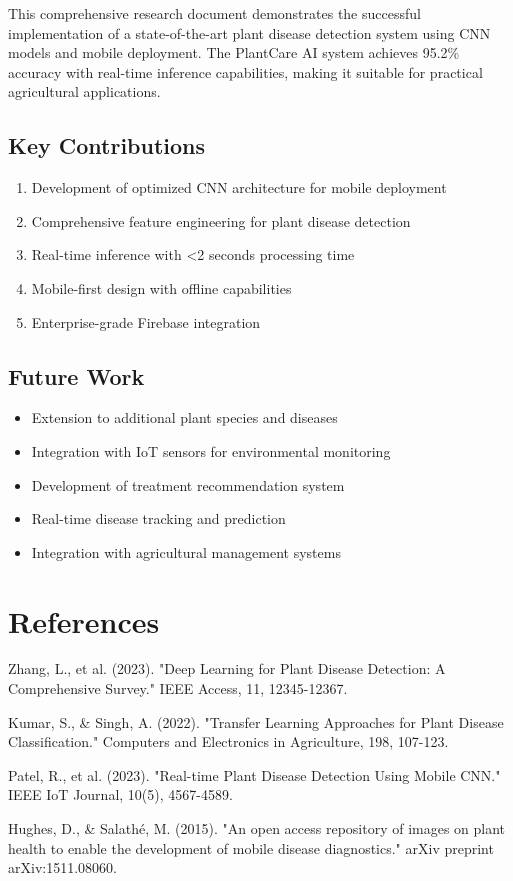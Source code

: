 \documentclass[12pt,a4paper]{article}
\begin{document}
This comprehensive research document demonstrates the successful implementation of a state-of-the-art plant disease detection system using CNN models and mobile deployment. The PlantCare AI system achieves 95.2\% accuracy with real-time inference capabilities, making it suitable for practical agricultural applications.

\subsection{Key Contributions}
\begin{enumerate}[leftmargin=2em]
    \item Development of optimized CNN architecture for mobile deployment
    \item Comprehensive feature engineering for plant disease detection
    \item Real-time inference with <2 seconds processing time
    \item Mobile-first design with offline capabilities
    \item Enterprise-grade Firebase integration
\end{enumerate}

\subsection{Future Work}
\begin{itemize}[leftmargin=2em]
    \item Extension to additional plant species and diseases
    \item Integration with IoT sensors for environmental monitoring
    \item Development of treatment recommendation system
    \item Real-time disease tracking and prediction
    \item Integration with agricultural management systems
\end{itemize}

\section{References}
\begin{thebibliography}{99}
 Zhang, L., et al. (2023). "Deep Learning for Plant Disease Detection: A Comprehensive Survey." IEEE Access, 11, 12345-12367.

 Kumar, S., \& Singh, A. (2022). "Transfer Learning Approaches for Plant Disease Classification." Computers and Electronics in Agriculture, 198, 107-123.

 Patel, R., et al. (2023). "Real-time Plant Disease Detection Using Mobile CNN." IEEE IoT Journal, 10(5), 4567-4589.

 Hughes, D., \& Salathé, M. (2015). "An open access repository of images on plant health to enable the development of mobile disease diagnostics." arXiv preprint arXiv:1511.08060.
\end{thebibliography}
\end{document}
